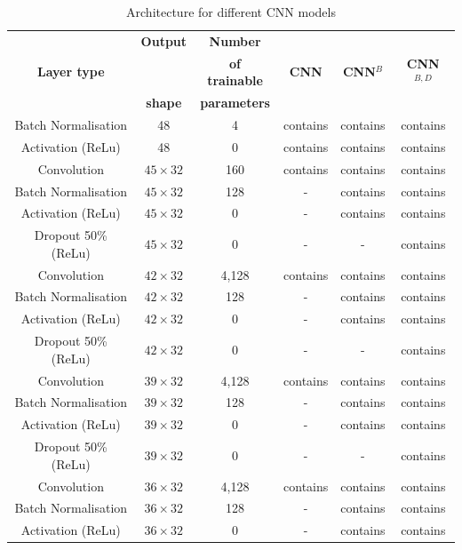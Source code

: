 \documentclass[aerospace,article,submit,moreauthors,pdftex]{Definitions/mdpi}
\begin{document}
\begin{table}[]
    \caption{Architecture for different CNN models}
    \centering
    \begin{tabular}{c c c c c c}
    \toprule
	& \textbf{Output}	& \textbf{Number } & &  & \\
    \textbf{Layer type}	& 	& \textbf{of trainable } & \textbf{CNN} & \textbf{CNN$^B$} & \textbf{CNN$^{B,D}$}\\
   	& \textbf{shape}	& \textbf{parameters} &  &  & \\
	\midrule
        Batch Normalisation         & 48 & 4 & contains & contains & contains\\
        Activation (ReLu)           & 48 & 0 & contains & contains & contains\\
        Convolution                 & $45 \times 32$ & 160 & contains & contains & contains\\
        Batch Normalisation         & $45 \times 32$ & 128 & - & contains & contains\\
        Activation (ReLu)           & $45 \times 32$ & 0 & - & contains & contains\\
        Dropout 50\% (ReLu)        & $45 \times 32$ & 0 & - & - & contains\\
        Convolution                 & $42 \times 32$ & 4,128 & contains & contains & contains\\
        Batch Normalisation         & $42 \times 32$ & 128 & - & contains & contains\\
        Activation (ReLu)           & $42 \times 32$ & 0 & - & contains & contains\\
        Dropout 50\% (ReLu)        & $42 \times 32$ & 0 & - & - & contains\\
        Convolution                 & $39 \times 32$ & 4,128 & contains & contains & contains\\
        Batch Normalisation         & $39 \times 32$ & 128 & - & contains & contains\\
        Activation (ReLu)           & $39 \times 32$ & 0 & - & contains & contains\\
        Dropout 50\% (ReLu)        & $39 \times 32$ & 0 & - & - & contains\\
        Convolution                 & $36 \times 32$ & 4,128 & contains & contains & contains\\
        Batch Normalisation         & $36 \times 32$ & 128 & - & contains & contains\\
        Activation (ReLu)           & $36 \times 32$ & 0 & - & contains & contains\\

\end{tabular}
\end{table}
\end{document}
